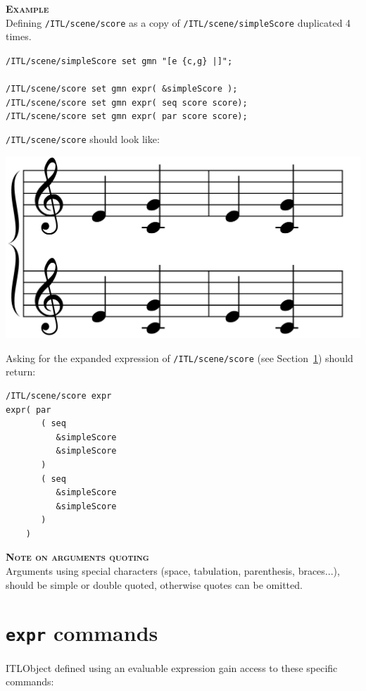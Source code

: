 \documentclass[a4paper,twoside]{report}
\newcommand{\sublevel}[1]	{\section{#1}}
\newcommand{\OSC}[1]		{\texttt{#1}}
\newcommand{\example}		{\textbf{\hspace{-1.5cm}\textbf{\textsc{Example }}}}
\newcommand{\note}	[1]		{\vspace{2mm}\textbf{\hspace{-1.03cm}\textbf{\textsc{Note #1}}}}
\newcommand{\lowTilde} 		{\texttildelow}
\newcommand{\sample}	[1]			{\vspace{-2mm}\begin{center}\colorbox{mygrey}{
								\begin{minipage}[t]{0.9\columnwidth} 
								{\small \texttt{#1}}
								\end{minipage}}\end{center}}
\begin{document}
\example\\
Defining \OSC{/ITL/scene/score} as a copy of \OSC{/ITL/scene/simpleScore} duplicated 4 times.
\sample{/ITL/scene/simpleScore set gmn "[e \{c,g\} |]";\\
\\
/ITL/scene/score set gmn expr( \&simpleScore );\\
/ITL/scene/score set gmn expr( seq \lowTilde score \lowTilde score);\\
/ITL/scene/score set gmn expr( par \lowTilde score \lowTilde score);\\
}
\OSC{/ITL/scene/score} should look like:\\
\begin{center}
 \includegraphics[scale=0.1]{imgs/seqparEnhanced}
\end{center}

Asking for the expanded expression of \OSC{/ITL/scene/score} (see Section~\ref{exprCmd}) should return:

\begin{verbatim}
/ITL/scene/score expr
expr( par
       ( seq
          &simpleScore
          &simpleScore
       )
       ( seq
          &simpleScore
          &simpleScore
       )
    )
\end{verbatim}
\smallbreak


\note {on arguments quoting} \\
Arguments using special characters (space, tabulation, parenthesis, braces...), should be simple or double quoted, otherwise quotes can be omitted.


\pagebreak

\sublevel{\OSC{expr} commands}
\label{exprCmd}

ITLObject defined using an evaluable expression gain access to these specific commands:
\end{document}
